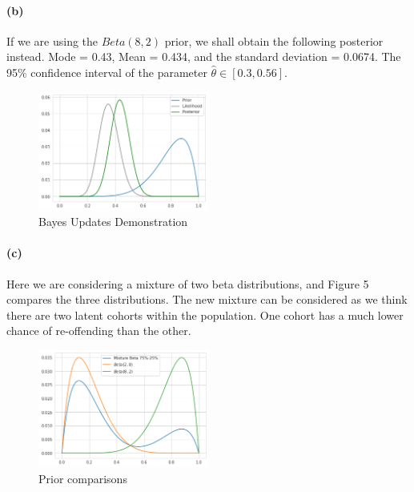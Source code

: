 \documentclass[11pt, letterpaper]{article}
\begin{document}
\paragraph{(b)}
If we are using the $Beta(8, 2)$ prior, we shall obtain the following posterior instead.
Mode = 0.43, Mean = 0.434,  and the standard deviation = 0.0674.
The 95$\%$ confidence interval of the parameter $\hat{\theta} \in [0.3, 0.56]$.

\begin{figure}[h]
    \captionsetup{justification=centering, margin=2cm}
    \centering
    \includegraphics[width=0.5\textwidth]{hw2_3.4.b.png}
    \caption{Bayes Updates Demonstration}
\end{figure}

\paragraph{(c)}
Here we are considering a mixture of two beta distributions, and Figure 5 compares the three distributions.
The new mixture can be considered as we think there are two latent cohorts within the population.
One cohort has a much lower chance of re-offending than the other.

\begin{figure}[h]
    \captionsetup{justification=centering, margin=2cm}
    \centering
    \includegraphics[width=0.5\textwidth]{hw2_3.4.c.png}
    \caption{Prior comparisons}
\end{figure}
\end{document}
